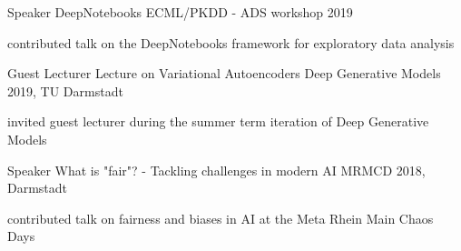 \begin{cventries}

  \cventry
    {Speaker} %
    {DeepNotebooks} %
    {ECML/PKDD - ADS workshop 2019} %
    {} %
    {
      \begin{cvitems} %
        \item {contributed talk on the DeepNotebooks framework for exploratory data analysis}
      \end{cvitems}
    }

  \cventry
    {Guest Lecturer} %
    {Lecture on Variational Autoencoders} %
    {Deep Generative Models 2019, TU Darmstadt} %
    {} %
    {
      \begin{cvitems} %
        \item {invited guest lecturer during the summer term iteration of Deep Generative Models}
      \end{cvitems}
    }
  \cventry
    {Speaker} %
    { What is "fair"? - Tackling challenges in modern AI} %
    {MRMCD 2018, Darmstadt} %
    {} %
    {
      \begin{cvitems} %
        \item {contributed talk on fairness and biases in AI at the Meta Rhein Main Chaos Days}
      \end{cvitems}
    }


\end{cventries}

